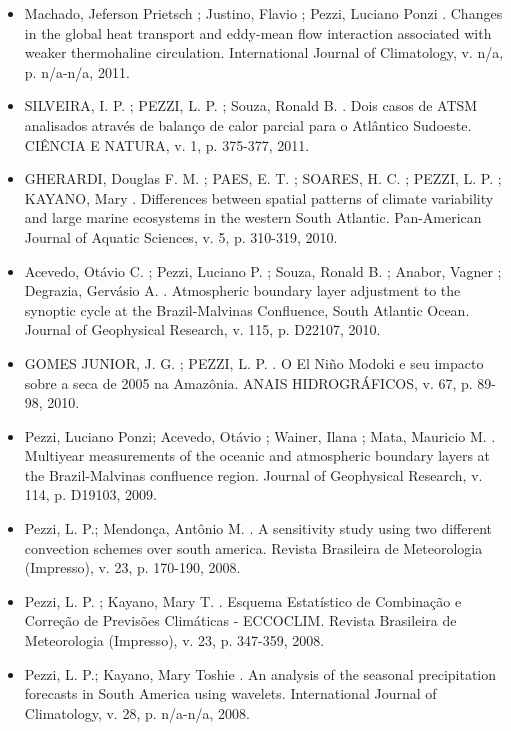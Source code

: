 \documentclass[11pt, a4paper]{awesome-cv}
\begin{document}
\begin{cvletter}
\begin{itemize}
  \item[] Machado, Jeferson Prietsch ; Justino, Flavio ; Pezzi, Luciano Ponzi . Changes in the global 
  heat transport and eddy-mean flow interaction associated with weaker thermohaline circulation. 
  International Journal of Climatology, v. n/a, p. n/a-n/a, 2011.

  \item[] SILVEIRA, I. P. ; PEZZI, L. P. ; Souza, Ronald B. . Dois casos de ATSM analisados através de
  balanço de calor parcial para o Atlântico Sudoeste. CIÊNCIA E NATURA, v. 1, p. 375-377,
  2011.

  \item[] 
  GHERARDI, Douglas F. M. ; PAES, E. T. ; SOARES, H. C. ; PEZZI, L. P. ; KAYANO, Mary . 
  Differences between spatial patterns of climate variability and large marine ecosystems in 
  the western South Atlantic. Pan-American Journal of Aquatic Sciences, v. 5, p. 310-319, 2010.

  \item[] Acevedo, Otávio C. ; Pezzi, Luciano P. ; Souza, Ronald B. ; Anabor, Vagner ; Degrazia, 
  Gervásio A. . Atmospheric boundary layer adjustment to the synoptic cycle at the Brazil-Malvinas 
  Confluence, South Atlantic Ocean. Journal of Geophysical Research, v. 115, p. D22107,
  2010.

  \item[] GOMES JUNIOR, J. G. ; PEZZI, L. P. . O El Niño Modoki e seu impacto sobre a seca de 2005 na 
  Amazônia. ANAIS HIDROGRÁFICOS, v. 67, p. 89-98, 2010. 

  \item[] Pezzi, Luciano Ponzi; Acevedo, Otávio ; Wainer, Ilana ; Mata, Mauricio M. . Multiyear 
  measurements of the oceanic and atmospheric boundary layers at the Brazil-Malvinas confluence region.
  Journal of Geophysical Research, v. 114, p. D19103, 2009.

  \item[] Pezzi, L. P.; Mendonça, Antônio M. . A sensitivity study using two different convection 
  schemes over south america. Revista Brasileira de Meteorologia (Impresso), v. 23, p. 170-190, 
  2008.

  \item[] Pezzi, L. P. ; Kayano, Mary T. . Esquema Estatístico de Combinação e Correção de Previsões 
  Climáticas - ECCOCLIM. Revista Brasileira de Meteorologia (Impresso), v. 23, p. 347-359,
  2008.

  \item[] Pezzi, L. P.; Kayano, Mary Toshie . An analysis of the seasonal precipitation forecasts in 
  South America using wavelets. International Journal of Climatology, v. 28, p. n/a-n/a, 2008.


\end{itemize}
\end{cvletter}
\end{document}
